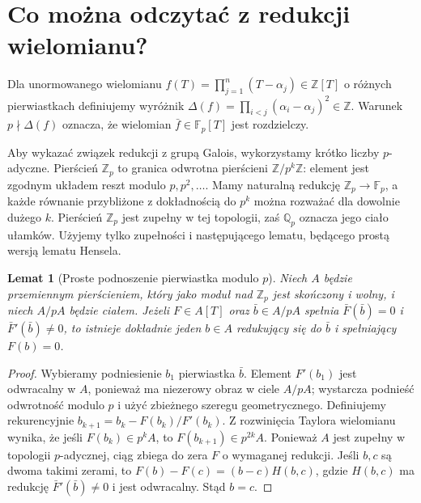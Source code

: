 \documentclass[11pt,a4paper,oneside]{book}
\numberwithin{equation}{section}
\theoremstyle{plain}
\newtheorem{lemat}[twierdzenie]{Lemat}
\theoremstyle{definition}
\theoremstyle{remark}
\newcommand{\Q}{\mathbb{Q}}
\newcommand{\Z}{\mathbb{Z}}
\newcommand{\F}{\mathbb{F}}
\begin{document}
\section{Co można odczytać z redukcji wielomianu?}

Dla unormowanego wielomianu $f(T)=\prod_{j=1}^n(T-\alpha_j)\in\Z[T]$ o różnych pierwiastkach definiujemy wyróżnik
$\Delta(f)=\prod_{i<j}(\alpha_i-\alpha_j)^2\in\Z$. Warunek $p\nmid\Delta(f)$ oznacza, że wielomian $\bar f\in\F_p[T]$ jest rozdzielczy.

Aby wykazać związek redukcji z grupą Galois, wykorzystamy krótko liczby $p$-adyczne. Pierścień $\Z_p$ to granica odwrotna pierścieni $\Z/p^k\Z$: element jest zgodnym układem reszt modulo $p,p^2,\ldots$. Mamy naturalną redukcję $\Z_p\to\F_p$, a każde równanie przybliżone z dokładnością do $p^k$ można rozważać dla dowolnie dużego $k$. Pierścień $\Z_p$ jest zupełny w tej topologii, zaś $\Q_p$ oznacza jego ciało ułamków. Użyjemy tylko zupełności i następującego lematu, będącego prostą wersją lematu Hensela.

\begin{lemat}[Proste podnoszenie pierwiastka modulo $p$]
Niech $A$ będzie przemiennym pierścieniem, który jako moduł nad $\Z_p$ jest skończony i wolny, i niech $A/pA$ będzie ciałem. Jeżeli $F\in A[T]$ oraz $\bar b\in A/pA$ spełnia $\bar F(\bar b)=0$ i $\bar F'(\bar b)\ne0$, to istnieje dokładnie jeden $b\in A$ redukujący się do $\bar b$ i spełniający $F(b)=0$.
\end{lemat}
\begin{proof}
Wybieramy podniesienie $b_1$ pierwiastka $\bar b$. Element $F'(b_1)$ jest odwracalny w $A$, ponieważ ma niezerowy obraz w ciele $A/pA$; wystarcza podnieść odwrotność modulo $p$ i użyć zbieżnego szeregu geometrycznego. Definiujemy rekurencyjnie $b_{k+1}=b_k-F(b_k)/F'(b_k)$. Z rozwinięcia Taylora wielomianu wynika, że jeśli $F(b_k)\in p^k A$, to $F(b_{k+1})\in p^{2k}A$. Ponieważ $A$ jest zupełny w topologii $p$-adycznej, ciąg zbiega do zera $F$ o wymaganej redukcji. Jeśli $b,c$ są dwoma takimi zerami, to $F(b)-F(c)=(b-c)H(b,c)$, gdzie $H(b,c)$ ma redukcję $\bar F'(\bar b)\ne0$ i jest odwracalny. Stąd $b=c$.
\end{proof}
\end{document}
